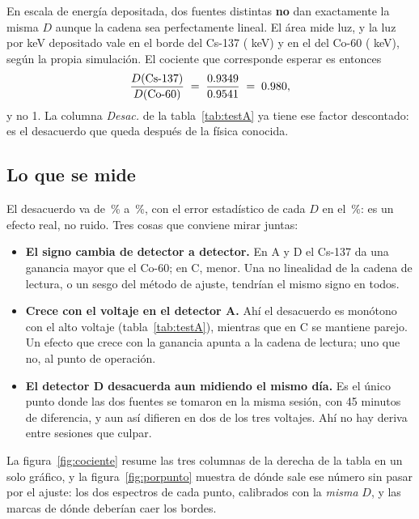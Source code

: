 \documentclass[11pt,a4paper]{article}
\begin{document}
En escala de energía depositada, dos fuentes distintas \textbf{no} dan
exactamente la misma $D$ aunque la cadena sea perfectamente lineal. El área
mide luz, y la luz por keV depositado vale \QuenchCs{} en el borde del Cs-137
(\BordeCs{} keV) y \QuenchCo{} en el del Co-60 (\BordeCoA{} keV), según la
propia simulación. El cociente que corresponde esperar es entonces
\[
   \frac{D(\text{Cs-137})}{D(\text{Co-60})}
   \;=\; \frac{0.9349}{0.9541} \;=\; 0.980,
\]
y no 1. La columna \emph{Desac.} de la tabla~\ref{tab:testA} ya tiene ese
factor descontado: es el desacuerdo que queda después de la física conocida.

\subsection{Lo que se mide}

\begin{table}[htbp]
\centering
\caption{Test de linealidad en cada punto de operación.}
\label{tab:testA}
{\small\setlength{\tabcolsep}{4.5pt}}
\end{table}

El desacuerdo va de \DesacMin\,\% a \DesacMax\,\%, con el error estadístico de
cada $D$ en el \ErrRelMediano\,\%: es un efecto real, no ruido. Tres cosas que
conviene mirar juntas:

\begin{itemize}
\item \textbf{El signo cambia de detector a detector.} En A y D el Cs-137 da
      una ganancia mayor que el Co-60; en C, menor. Una no linealidad de la
      cadena de lectura, o un sesgo del método de ajuste, tendrían el mismo
      signo en todos.
\item \textbf{Crece con el voltaje en el detector A.} Ahí el desacuerdo es
      monótono con el alto voltaje (tabla~\ref{tab:testA}), mientras que en C
      se mantiene parejo. Un efecto que crece con la ganancia apunta a la
      cadena de lectura; uno que no, al punto de operación.
\item \textbf{El detector D desacuerda aun midiendo el mismo día.} Es el único
      punto donde las dos fuentes se tomaron en la misma sesión, con 45 minutos
      de diferencia, y aun así difieren en dos de los tres voltajes. Ahí no
      hay deriva entre sesiones que culpar.
\end{itemize}

La figura~\ref{fig:cociente} resume las tres columnas de la derecha de la
tabla en un solo gráfico, y la figura~\ref{fig:porpunto} muestra de dónde sale
ese número sin pasar por el ajuste: los dos espectros de cada punto,
calibrados con la \emph{misma} $D$, y las marcas de dónde deberían caer los
bordes.
\end{document}
